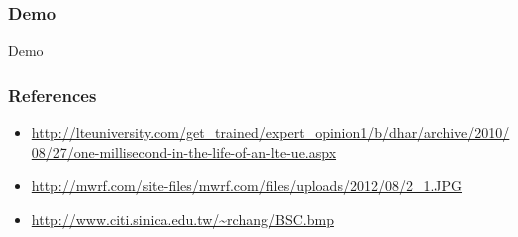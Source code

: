 \documentclass{beamer}
\begin{document}
\begin{frame}
\frametitle{Demo}
\Huge{\centerline{Demo}}
\end{frame}


\begin{frame}
\frametitle{References}
\begin{itemize}
\item \url{http://lteuniversity.com/get_trained/expert_opinion1/b/dhar/archive/2010/08/27/one-millisecond-in-the-life-of-an-lte-ue.aspx}
\item \url{http://mwrf.com/site-files/mwrf.com/files/uploads/2012/08/2_1.JPG}
\item \url{http://www.citi.sinica.edu.tw/~rchang/BSC.bmp}
\end{itemize}
\end{frame}

\end{document}
